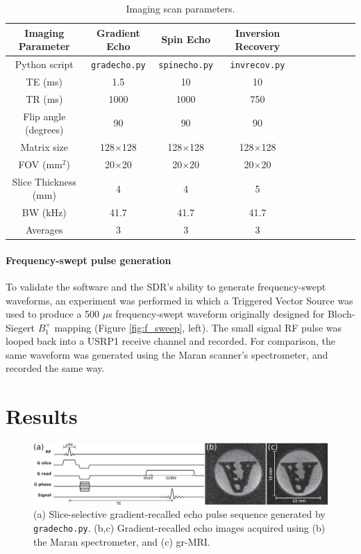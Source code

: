 \documentclass[review]{elsarticle}
\begin{document}
\begin{table}[!ht]
\begin{tabular}[c]{| c | c | c | c | c | c | c | c | c | c |}
	\hline
	\textbf{Imaging Parameter} 	& \textbf{Gradient Echo} 	& \textbf{Spin Echo}		& \textbf{Inversion Recovery} \\ \hline
	Python script 				& \texttt{gradecho.py} 	& \texttt{spinecho.py}	& \texttt{invrecov.py} \\ \hline
	TE (ms) 					& 1.5 				& 10 					& 10\\ \hline
	TR (ms) 					& 1000 				& 1000				& 750\\ \hline
	Flip angle (degrees) 			& 90 					& 90 					& 90\\ \hline
	Matrix size 				& 128$\times$128 		& 128$\times$128		& 128$\times$128\\ \hline
	FOV (mm$^2$) 			& 20$\times$20 		& 20$\times$20			& 20$\times$20\\ \hline
	Slice Thickness (mm) 		& 4 					& 4 					& 5\\ \hline
	BW (kHz) 					& 41.7 				& 41.7				& 41.7\\ \hline
	Averages 					& 3 					& 3 					& 3\\ \hline
\end{tabular}
\caption{Imaging scan parameters.}
\label{table:parameters}
\end{table}  

\paragraph{Frequency-swept pulse generation}
To validate the software and the SDR's ability to generate frequency-swept waveforms, 
an experiment was performed in which a Triggered Vector Source was used to 
produce a 500 $\mu$s frequency-swept waveform originally designed for Bloch-Siegert $B_1^+$ mapping \cite{janki:2013} (Figure \ref{fig:f_sweep}, left).
The small signal RF pulse was looped back into a USRP1 receive channel and recorded.
For comparison, the same waveform was generated using the Maran scanner's spectrometer,
and recorded the same way.


\section{Results}
\begin{figure}[h]
\begin{center}
\includegraphics[width = 1\textwidth,trim=0 0 0 0,clip=false]{Fig9_fromChris/Fig9.eps}%
\caption{(a) Slice-selective gradient-recalled echo pulse sequence generated by \texttt{gradecho.py}.
(b,c) Gradient-recalled echo images acquired using (b) the Maran spectrometer,
and (c) gr-MRI.}
\label{fig:gre_image}
\end{center}
\end{figure}
 
\end{document}
